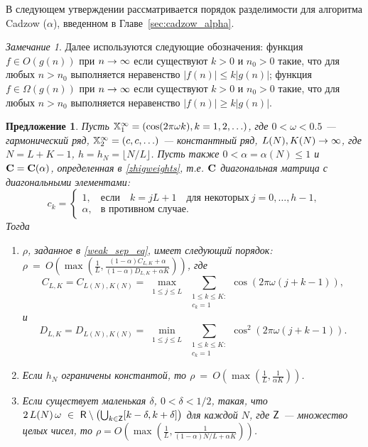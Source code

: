 \documentclass[12pt, specialist, subf,href,colorlinks=true,substylefile = spbu.rtx]{disser}
\newtheorem{proposition}{Предложение}
\theoremstyle{remark}
\newtheorem{remark}{Замечание}
\theoremstyle{definition}
\begin{document}
\smallskip
В следующем утверждении рассматривается порядок разделимости для алгоритма Cadzow ($\alpha$), введенном в Главе~\ref{sec:cadzow_alpha}.


\begin{remark}
	Далее используются следующие обозначения:
	функция $f \in O(g(n))$ при $n\rightarrow \infty$ если существуют $k>0$ и $n_0>0$ такие, что для любых $n > n_0$ выполняется неравенство $|f(n)| \le k |g(n)|$;
	функция $f \in \Omega(g(n))$ при $n\rightarrow \infty$ если существуют $k>0$ и $n_0>0$ такие, что для любых $n > n_0$ выполняется неравенство $|f(n)| \ge k |g(n)|$.
\end{remark}


\begin{proposition}
	\label{prop:separ1}
	Пусть $\mathbb{X}_1^\infty = (\cos(2 \pi \omega k), k = 1, 2, \ldots)$, где $0<\omega <0.5$ --- гармонический ряд, $\mathbb{X}_2^\infty = (c, c, \ldots)$ --- константный ряд,  $L(N),K(N)\rightarrow \infty$, где $N=L+K-1$, $h = h_N = \lfloor N/L \rfloor$. Пусть также $0<\alpha=\alpha(N)\le 1$ и $\mathbf{C}=\mathbf{C}(\alpha)$, определенная в \eqref{zhigweights}, т.е. $\mathbf{C}$ диагональная матрица с диагональными элементами:
	\begin{equation*}
	c_k = \begin{cases}
	1, & \text{если} \quad k = jL+1 \quad \text{для некоторых} \ j = 0, \ldots, h-1,\\
	\alpha, & \text{в противном случае}.
	\end{cases}
	\end{equation*}
	Тогда
	\begin{enumerate}
		\item $\rho$, заданное в \eqref{weak_sep_eq}, имеет следующий порядок: $\rho~=~O\left(\max\left(\frac{1}{L}, \frac{(1-\alpha)C_{L,K}+\alpha}{(1-\alpha)D_{L,K}+\alpha K}\right)\right)$, где
		\begin{equation*}
		C_{L,K} = C_{L(N),K(N)} = \max_{\substack{1 \le j \le L}}  \sum_{\substack{1 \le k \le K: \\ c_k = 1}}\cos(2 \pi \omega (j + k - 1)),		\end{equation*} и
		\begin{equation*}
		D_{L,K} = D_{L(N),K(N)} = \min_{\substack{1 \le j \le L}} \sum_{\substack{1 \le k \le K: \\ c_k = 1}}\cos^2(2 \pi \omega (j + k - 1)).
		\end{equation*}
		\item Если $h_N$ ограничены константой, то $\rho~=~O\left(\max\left(\frac{1}{L}, \frac{1}{\alpha K}\right)\right)$.
		\item Если существует маленькая $\delta$, $0 < \delta < 1/2$, такая, что $2\,L(N)\,\omega~\in~ \mathsf{R} \setminus \left(\bigcup_{k \in \mathsf{Z}} [k - \delta, k + \delta] \right)$ для каждой $N$, где $\mathsf{Z}$ --- множество целых чисел, то $\rho = O\left(\max\left(\frac{1}{L}, \frac{1}{(1-\alpha)N/L+\alpha K}\right)\right)$.
	\end{enumerate}
	
\end{proposition}
\end{document}
